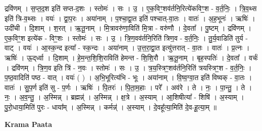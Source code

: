 \documentclass[17pt]{extarticle}
\begin{document}
द्रवि॑णम् । स॒प्त॒द॒श इति॑ सप्त-द॒शः । स्तोमः॑ । सः । उ॒ । ए॒क॒विꣳ॒॒शव॑र्तनि॒रित्ये॑कविꣳ॒॒श - व॒र्त॒निः॒ । त्रि॒व॒थ्स इति॑ त्रि-व॒थ्सः । वयः॑ । द्वा॒प॒रः । अया॑नाम् । प॒श्चा॒द्वा॒त इति॑ पश्चात्-वा॒तः । वातः॑ । अ॒ह॒भूनः॑ । ऋषिः॑ । उदी॑ची । दि॒शाम् । श॒रत् । ऋ॒तू॒नाम् । मि॒त्रावरु॑णा॒विति॑ मि॒त्रा - वरु॑णौ । दे॒वता᳚ । पु॒ष्टम् । द्रवि॑णम् । ए॒क॒विꣳ॒॒श इत्ये॑क - विꣳ॒॒शः । स्तोमः॑ । सः । उ॒ । त्रि॒ण॒वव॑र्तनि॒रिति॑ त्रिण॒व - व॒र्त॒निः॒ । तु॒र्य॒वाडिति॑ तुर्य - वाट् । वयः॑ । आ॒स्क॒न्द इत्या᳚ - स्क॒न्दः । अया॑नाम् । उ॒त्त॒रा॒द्वा॒त इत्यु॑त्तरात् - वा॒तः । वातः॑ । प्र॒त्नः । ऋषिः॑ । ऊ॒द्‌र्ध्वा । दि॒शाम् । हे॒म॒न्त॒शि॒शि॒राविति॑ हेमन्त - शि॒शि॒रौ । ऋ॒तू॒नाम् । बृह॒स्पतिः॑ । दे॒वता᳚ । वर्चः॑ । द्रवि॑णम् । त्रि॒ण॒व इति त्रि॑ - न॒वः । स्तोमः॑ । सः । उ॒ । त्र॒य॒स्त्रिꣳ॒॒शव॑र्तनि॒रिति॑ त्रयस्त्रिꣳ॒॒श - व॒र्त॒निः॒ । प॒ष्ठ॒वादिति॑ पष्ठ - वात् । वयः॑ ( ) । अ॒भि॒भूरित्य॑भि - भूः । अया॑नाम् । वि॒ष्व॒ग्वा॒त इति॑ विष्वक् - वा॒तः । वातः॑ । सु॒प॒र्ण इति॑ सु - प॒र्णः । ऋषिः॑ । पि॒तरः॑ । पि॒ता॒म॒हाः । परे᳚ । अव॑रे । ते । नः॒ । पा॒न्तु॒ । ते । नः॒ । अ॒व॒न्तु॒ । अ॒स्मिन्न् । ब्रह्मन्न्॑ । अ॒स्मिन्न् । क्ष॒त्रे । अ॒स्याम् । आ॒शिषीत्या᳚ - शिषि॑ । अ॒स्याम् । पु॒रो॒धाया॒मिति॑ पुरः - धाया᳚म् । अ॒स्मिन्न् । कर्मन्न्॑ । अ॒स्याम् । दे॒वहू᳚त्या॒मिति॑ दे॒व-हू॒त्या॒म् ॥  \newline


\textbf{Krama Paata} \newline
\end{document}

